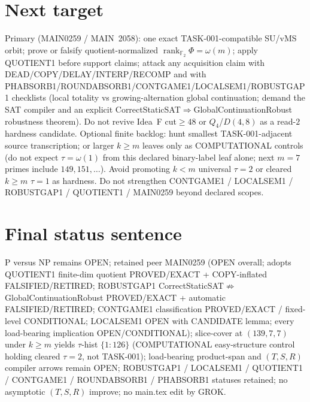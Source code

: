 \documentclass[11pt]{article}
\begin{document}
\section*{Next target}
Primary (MAIN0259 / MAIN~2058): one exact TASK-001-compatible SU/vMS orbit; prove or falsify
quotient-normalized $\operatorname{rank}_{\mathbb F_2}\Phi=\omega(m)$; apply QUOTIENT1 before support claims;
attack any acquisition claim with
DEAD/COPY/DELAY/INTERP/RECOMP and with PHABSORB1/ROUNDABSORB1/CONTGAME1/LOCALSEM1/ROBUSTGAP1 checklists
(local totality vs growing-alternation global continuation; demand the SAT compiler and an
explicit CorrectStaticSAT$\Rightarrow$GlobalContinuationRobust robustness theorem).
Do not revive Idea~F cut$\ge48$ or $Q_4$/$D(4,8)$ as a read-$2$ hardness candidate.
Optional finite backlog: hunt smallest TASK-001-adjacent source transcription;
or larger $k{\ge}m$ leaves only as COMPUTATIONAL controls (do not expect $\tau=\omega(1)$
from this declared binary-label leaf alone; next $m{=}7$ primes include $149,151,\ldots$).
Avoid promoting $k{<}m$ universal $\tau{=}2$ or cleared $k{\ge}m$ $\tau{=}1$ as hardness.
Do not strengthen CONTGAME1 / LOCALSEM1 / ROBUSTGAP1 / QUOTIENT1 / MAIN0259 beyond declared scopes.

\section*{Final status sentence}
P versus NP remains OPEN; retained peer MAIN0259 (OPEN overall; adopts QUOTIENT1 finite-dim quotient PROVED/EXACT + COPY-inflated FALSIFIED/RETIRED; ROBUSTGAP1 CorrectStaticSAT$\not\Rightarrow$GlobalContinuationRobust PROVED/EXACT + automatic FALSIFIED/RETIRED; CONTGAME1 classification PROVED/EXACT / fixed-level CONDITIONAL; LOCALSEM1 OPEN with CANDIDATE lemma; every load-bearing implication OPEN/CONDITIONAL); slice-cover at $(139,7,7)$ under $k{\ge}m$ yields $\tau$-hist $\{1{:}126\}$ (COMPUTATIONAL easy-structure control holding cleared $\tau{=}2$, not TASK-001); load-bearing product-span and $(T,S,R)$ compiler arrows remain OPEN; ROBUSTGAP1 / LOCALSEM1 / QUOTIENT1 / CONTGAME1 / ROUNDABSORB1 / PHABSORB1 statuses retained; no asymptotic $(T,S,R)$ improve; no main.tex edit by GROK.
\end{document}
